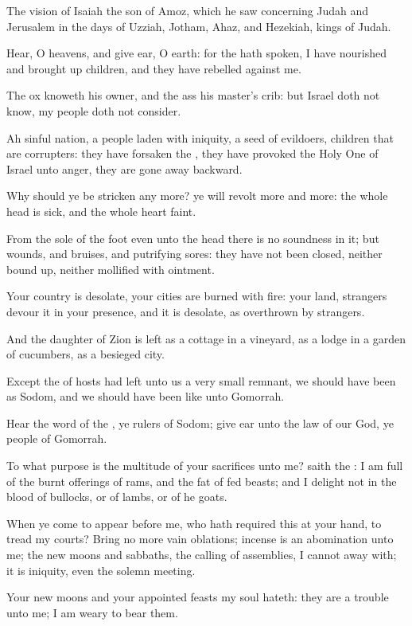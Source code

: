 \Chapter
\Verse The vision of Isaiah the son of Amoz, which he saw concerning Judah and Jerusalem in the days of Uzziah, Jotham, Ahaz, and Hezekiah, kings of Judah.

\Verse Hear, O heavens, and give ear, O earth: for the \LORD hath spoken, I have nourished and brought up children, and they have rebelled against me.

\Verse The ox knoweth his owner, and the ass his master's crib: but Israel doth not know, my people doth not consider.

\Verse Ah sinful nation, a people laden with iniquity, a seed of evildoers, children that are corrupters: they have forsaken the \LORD, they have provoked the Holy One of Israel unto anger, they are gone away backward.

\Verse Why should ye be stricken any more? ye will revolt more and more: the whole head is sick, and the whole heart faint.

\Verse From the sole of the foot even unto the head there is no soundness in it; but wounds, and bruises, and putrifying sores: they have not been closed, neither bound up, neither mollified with ointment.

\Verse Your country is desolate, your cities are burned with fire: your land, strangers devour it in your presence, and it is desolate, as overthrown by strangers.

\Verse And the daughter of Zion is left as a cottage in a vineyard, as a lodge in a garden of cucumbers, as a besieged city.

\Verse Except the \LORD of hosts had left unto us a very small remnant, we should have been as Sodom, and we should have been like unto Gomorrah.

\Verse Hear the word of the \LORD, ye rulers of Sodom; give ear unto the law of our God, ye people of Gomorrah.

\Verse To what purpose is the multitude of your sacrifices unto me?  saith the \LORD: I am full of the burnt offerings of rams, and the fat of fed beasts; and I delight not in the blood of bullocks, or of lambs, or of he goats.

\Verse When ye come to appear before me, who hath required this at your hand, to tread my courts?  \Verse Bring no more vain oblations; incense is an abomination unto me; the new moons and sabbaths, the calling of assemblies, I cannot away with; it is iniquity, even the solemn meeting.

\Verse Your new moons and your appointed feasts my soul hateth: they are a trouble unto me; I am weary to bear them.

